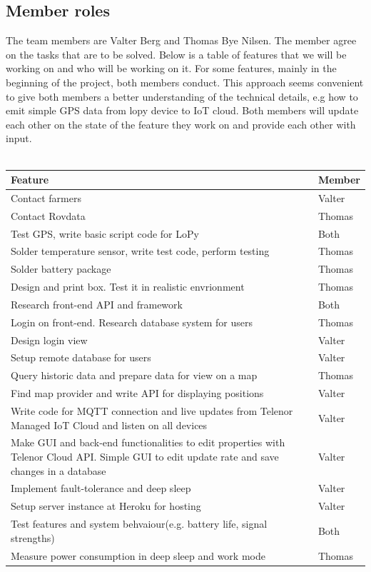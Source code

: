 	\subsection{Member roles}
		The team members are Valter Berg and Thomas Bye Nilsen. The member agree on the tasks that are to be solved. Below is a table of features that we will be working on and who will be working on it. For some features, mainly in the beginning of the project, both members conduct. This approach seems convenient to give both members a better understanding of the technical details, e.g how to emit simple GPS data from lopy device to IoT cloud. Both members will update each other on the state of the feature they work on and provide each other with input. 
		\\\\
		\begin{longtable}{ | p{10cm} | p{1.3cm}|}
			\hline
			\textbf{Feature} & \textbf{Member}\\ \hline
			Contact farmers & Valter\\ \hline
			Contact Rovdata & Thomas\\ \hline
			Test GPS, write basic script code for LoPy & Both\\ \hline
			Solder temperature sensor, write test code, perform testing & Thomas\\ \hline
			Solder battery package & Thomas\\ \hline
			Design and print box. Test it in realistic envrionment & Thomas\\ \hline
			Research front-end API and framework & Both\\ \hline
			Login on front-end. Research database system for users & Thomas\\ \hline
			Design login view & Valter\\ \hline
			Setup remote database for users & Valter\\ \hline
			Query historic data and prepare data for view on a map & Thomas\\ \hline
			Find map provider and write API for displaying positions & Valter\\ \hline
			Write code for MQTT connection and live updates from Telenor Managed IoT Cloud and listen on all devices & Valter\\ \hline
			Make GUI and back-end functionalities to edit properties with Telenor Cloud API. Simple GUI to edit update rate and save changes in a database & Valter\\ \hline
			Implement fault-tolerance and deep sleep & Valter\\ \hline
			Setup server instance at Heroku for hosting & Valter\\ \hline
			Test features and system behvaiour(e.g. battery life, signal strengths) & Both\\ \hline
			Measure power consumption in deep sleep and work mode & Thomas\\ \hline
		\end{longtable}
